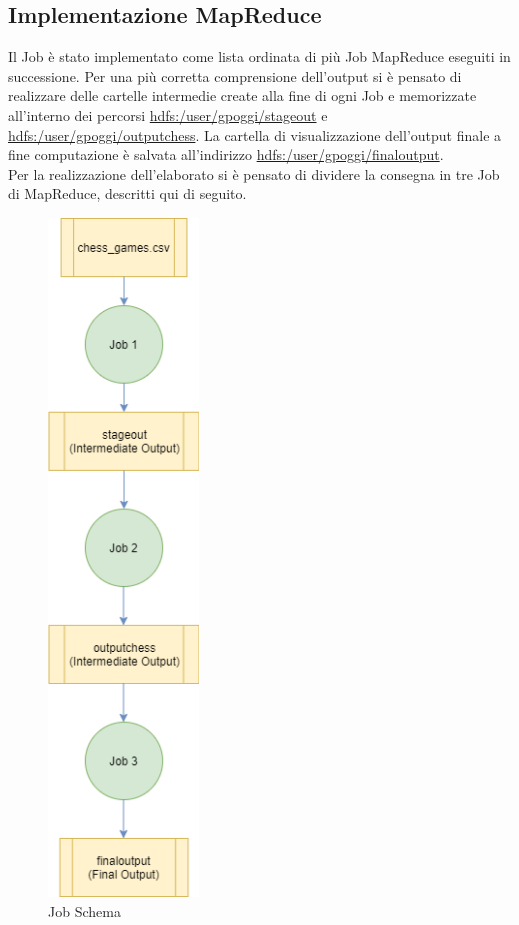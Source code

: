 \documentclass[10pt]{article}
\begin{document}
\subsection{Implementazione MapReduce}

Il Job \`e stato implementato come lista ordinata di pi\`u Job MapReduce eseguiti in successione. Per una pi\`u corretta comprensione dell'output si \`e pensato di realizzare delle cartelle intermedie create alla fine di ogni Job e memorizzate all'interno dei percorsi \url{hdfs:/user/gpoggi/stageout} e \url{hdfs:/user/gpoggi/outputchess}. La cartella di visualizzazione dell'output finale a fine computazione \`e salvata all'indirizzo \url{hdfs:/user/gpoggi/finaloutput}.\\ Per la realizzazione dell'elaborato si \`e pensato di dividere la consegna in tre Job di MapReduce, descritti qui di seguito.

\begin{figure}[htp]
    \centering
    \includegraphics[width=4cm]{images/MapReduce.png}
    \caption{Job Schema}
\end{figure}
\end{document}
